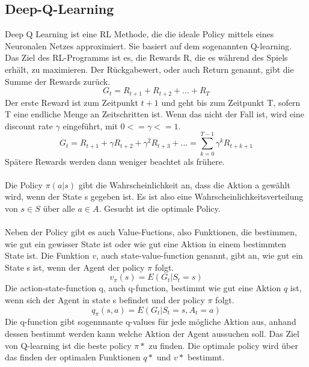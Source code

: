 \subsection{Deep-Q-Learning}
Deep Q Learning ist eine RL Methode, die die ideale Policy mittels eines Neuronalen Netzes approximiert. Sie basiert auf dem sogenannten Q-learning.
\\
Das Ziel des RL-Programms ist es, die Rewards R, die es während des Spiels erhält, zu maximieren. Der Rückgabewert, oder auch Return genannt, gibt die Summe der Rewards zurück.
\begin{equation}
	G_t = R_{t+1}+R_{t+2}+...+R_T
\end{equation}
Der erste Reward ist zum Zeitpunkt $t+1$ und geht bis zum Zeitpunkt T, sofern T eine endliche Menge an Zeitschritten ist.
Wenn das nicht der Fall ist, wird eine discount rate $\gamma{}$ eingeführt, mit $0<=\gamma{}<=1$.
\begin{equation}
	G_t = R_{t+1}+\gamma{}R_{t+2}+\gamma{}^2R_{t+3}+... = \sum_{k=0}^{T-1} \gamma{}^kR_{t+k+1}
\end{equation}
Spätere Rewards werden dann weniger beachtet als frühere.
\\\\
Die Policy $\pi{}(a|s)$ gibt die Wahrscheinlichkeit an, dass die Aktion a gewählt wird, wenn der State s gegeben ist. Es ist also eine Wahrscheinlichkeitsverteilung von $s \in S$ über alle $a \in A$. Gesucht ist die optimale Policy.
\\\\
Neben der Policy gibt es auch Value-Fuctions, also Funktionen, die bestimmen, wie gut ein gewisser State ist oder wie gut eine Aktion in einem bestimmten State ist.
Die Funktion $v$, auch state-value-function genannt, gibt an, wie gut ein State s ist, wenn der Agent der policy $\pi$ folgt. 
\begin{equation}
	v_\pi(s) = E(G_t|S_t=s)
\end{equation}
Die action-state-function q, auch q-function, bestimmt wie gut eine Aktion $q$ ist, wenn sich der Agent in state s befindet und der policy $\pi$ folgt.
\begin{equation}
	q_\pi(s,a) = E(G_t|S_t=s, A_t=a)
\end{equation}
Die q-function gibt sogennnante q-values für jede mögliche Aktion aus, anhand dessen bestimmt werden kann welche Aktion der Agent aussuchen soll. 
Das Ziel von Q-learning ist die beste policy $\pi*$ zu finden. Die optimale policy wird über das finden der optimalen Funktionen $q*$ und $v*$ bestimmt. 
